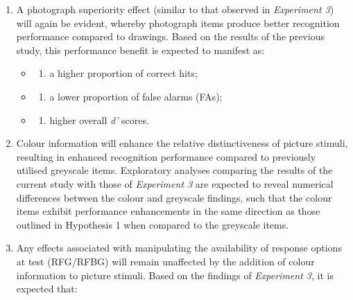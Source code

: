 \documentclass[
  11pt,
]{article}
\providecommand{\tightlist}{%
  \setlength{\itemsep}{0pt}\setlength{\parskip}{0pt}}
\begin{document}
\begin{enumerate}
\def\labelenumi{\arabic{enumi}.}
\item
  A photograph superiority effect (similar to that observed in
  \emph{Experiment 3}) will again be evident, whereby photograph items
  produce better recognition performance compared to drawings. Based on
  the results of the previous study, this performance benefit is
  expected to manifest as:

  \begin{itemize}
  \item
    \begin{enumerate}
    \def\labelenumii{\roman{enumii})}
    \tightlist
    \item
      a higher proportion of correct hits;
    \end{enumerate}
  \item
    \begin{enumerate}
    \def\labelenumii{\roman{enumii})}
    \setcounter{enumii}{1}
    \tightlist
    \item
      a lower proportion of false alarms (FAs);
    \end{enumerate}
  \item
    \begin{enumerate}
    \def\labelenumii{\roman{enumii})}
    \setcounter{enumii}{2}
    \tightlist
    \item
      higher overall \emph{d'} scores.
    \end{enumerate}
  \end{itemize}
\item
  Colour information will enhance the relative distinctiveness of
  picture stimuli, resulting in enhanced recognition performance
  compared to previously utilised greyscale items. Exploratory analyses
  comparing the results of the current study with those of
  \emph{Experiment 3} are expected to reveal numerical differences
  between the colour and greyscale findings, such that the colour items
  exhibit performance enhancements in the same direction as those
  outlined in Hypothesis 1 when compared to the greyscale items.
\item
  Any effects associated with manipulating the availability of response
  options at test (RFG/RFBG) will remain unaffected by the addition of
  colour information to picture stimuli. Based on the findings of
  \emph{Experiment 3}, it is expected that:


\end{enumerate}
\end{document}
